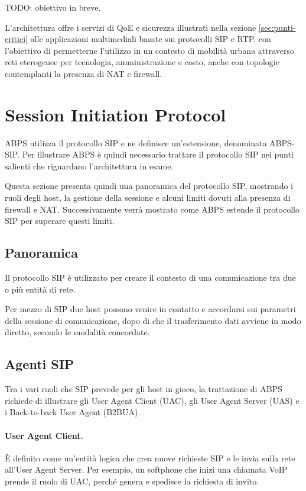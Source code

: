 \documentclass[12pt,a4paper,openright,twoside]{book}
\begin{document}
TODO: obiettivo in breve.

L'architettura offre i servizi di QoE e sicurezza illustrati nella
sezione \ref{sec:punti-critici} alle applicazioni multimediali basate
sui protocolli SIP e RTP, con l'obiettivo di permetterne l'utilizzo in
un contesto di mobilità urbana attraverso reti eterogenee per
tecnologia, amministrazione e costo, anche con topologie contemplanti la
presenza di NAT e firewall.

\section{Session Initiation Protocol}

ABPS utilizza il protocollo SIP e ne definisce un'estensione,
denominata ABPS-SIP. Per illustrare ABPS è quindi necessario trattare
il protocollo SIP nei punti salienti che riguardano l'architettura in
esame.

Questa sezione presenta quindi una panoramica del protocollo SIP,
mostrando i ruoli degli host, la gestione della sessione e alcuni
limiti dovuti alla presenza di firewall e NAT. Successivamente verrà
mostrato come ABPS estende il protocollo SIP per superare questi
limiti.

\subsection{Panoramica}

Il protocollo SIP è utilizzato per creare il contesto di una
comunicazione tra due o più entità di rete.

Per mezzo di SIP due host possono venire in contatto e accordarsi sui
parametri della sessione di comunicazione, dopo di che il
trasferimento dati avviene in modo diretto, secondo le modalità
concordate.

\subsection{Agenti SIP}

Tra i vari ruoli che SIP prevede per gli host in gioco, la trattazione
di ABPS richiede di illustrare gli User Agent Client (UAC), gli User
Agent Server (UAS) e i Back-to-back User Agent (B2BUA).

\paragraph{User Agent Client.}
È definito come un'entità logica che crea nuove richieste SIP e le
invia sulla rete all'User Agent Server. Per esempio, un softphone che
inizi una chiamata VoIP prende il ruolo di UAC, perché genera e
spedisce la richiesta di invito.
\end{document}
